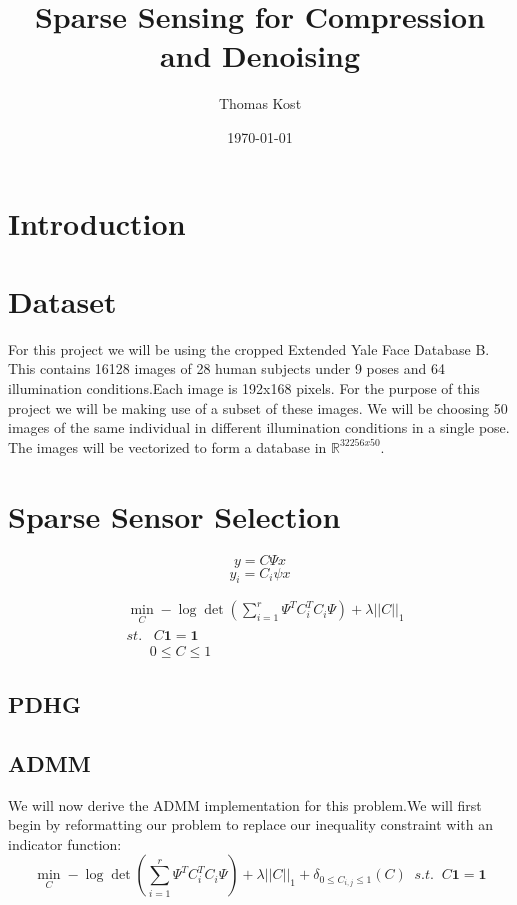 \documentclass[12pt, letterpaper]{article}
\begin{document}
		\title{\vspace{-1in} Sparse Sensing for Compression and Denoising} %
	\author{Thomas Kost}
	\date{\today}
	\maketitle
	\tableofcontents
	
	\section{Introduction}
	\section{Dataset}
	For this project we will be using the cropped Extended Yale Face Database B\cite{GeBeKr01}. This contains 16128 images of 28 human subjects under 9 poses and 64 illumination conditions.Each image is 192x168 pixels. For the purpose of this project we will be making use of a subset of these images. We will be choosing 50 images of the same individual in different illumination conditions in a single pose. The images will be vectorized to form a database in $\mathbb{R}^{32256x50}$.
	\section{Sparse Sensor Selection}
	\[ y = C\Psi x\]
	\[y_{i} = C_{i}\psi x\]
	
	\begin{align*}
			&\min_{C} -\log \det \left(\sum_{i=1}^{r}\Psi ^{T}C_{i}^{T}C_{i}\Psi\right)
	 +\lambda||C||_{1}\\
		&st. \;\;\;	C\mathbf{1} =\mathbf{1} \\
		& \;\;\;\;\;\;0 \leq C \leq 1
	\end{align*}
	\subsection{PDHG}
	
	\subsection{ADMM}
	We will now derive the ADMM implementation for this problem.We will first begin by reformatting our problem to replace our inequality constraint with an indicator function:
	\[ \min_{C} -\log \det \left(\sum_{i=1}^{r}\Psi ^{T}C_{i}^{T}C_{i}\Psi\right)
	+\lambda||C||_{1} +\delta_{0\leq C_{i,j}\leq 1}(C) \;\; s.t. \;\; C\mathbf{1} = \mathbf{1} \]
	
\end{document}
